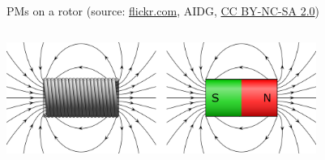 \begin{frame}
\begin{columns}
\begin{column}{0.4\textwidth}
\begin{figure}
                \caption{PMs on a rotor (source: \href{https://www.flickr.com/photos/aidg/2382339376}{flickr.com}, AIDG, \href{https://creativecommons.org/licenses/by-nc-sa/2.0/}{CC BY-NC-SA 2.0})}
            \end{figure}
        \end{column}
    \end{columns}
    \begin{figure}
    \begin{columns}
        \begin{column}{0.6\textwidth}
                \centering
                \includegraphics[width=0.9\textwidth]{fig/lec02/Coil_magnet_comparison.pdf}
        \end{column}
    \end{columns}
    \end{figure}
    \end{frame}

